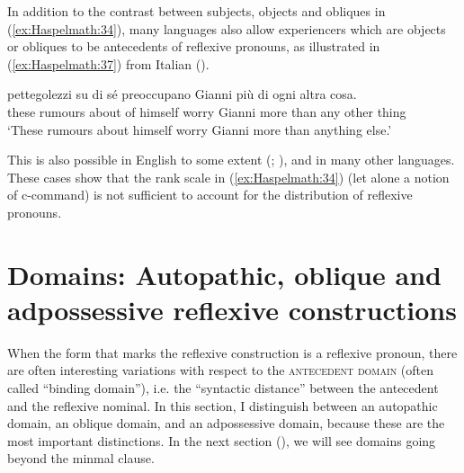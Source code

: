 \documentclass[output=paper]{langscibook}
\begin{document}
In addition to the contrast between subjects, objects and obliques in (\ref{ex:Haspelmath:34}), many languages also allow experiencers which are objects or obliques to be antecedents of reflexive pronouns, as illustrated in (\ref{ex:Haspelmath:37}) from Italian (\citealt{BellettiRizzi1988}).

\ea%
    \label{ex:Haspelmath:37}
      {pettegolezzi}  {su}  {di}  {sé}  {preoccupano}  {Gianni} {più}  {di}  {ogni}  {altra}  {cosa.} \\
       these  rumours  about  of  himself  worry  Gianni more  than  any  other  thing \\
    \glt‘These rumours about himself worry Gianni more than anything else.’
\z

  

This is also possible in English to some extent (\citealt[81]{Reinhart1983}; \citealt[127]{Pesetsky1987}), and in many other languages. These cases show that the rank scale in (\ref{ex:Haspelmath:34}) (let alone a notion of c-command) is not sufficient to account for the distribution of reflexive pronouns.


\section{Domains: Autopathic, oblique and adpossessive reflexive constructions}\label{sec:Haspelmath:8}
When the form that marks the reflexive construction is a reflexive pronoun, there are often interesting variations with respect to the \textsc{antecedent} \textsc{domain} (often called “binding domain”), i.e. the “syntactic distance” between the antecedent and the reflexive nominal. In this section, I distinguish between an autopathic domain, an oblique domain, and an adpossessive domain, because these are the most important distinctions. In the next section (), we will see domains going beyond the minmal clause.
\end{document}
